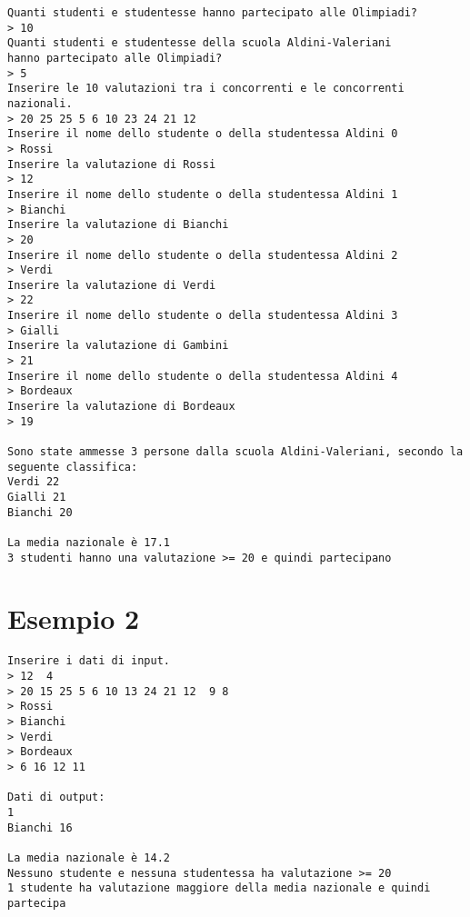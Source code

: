\documentclass[a4paper, 11pt]{exam}
\begin{document}
\begin{verbatim}
Quanti studenti e studentesse hanno partecipato alle Olimpiadi?
> 10
Quanti studenti e studentesse della scuola Aldini-Valeriani 
hanno partecipato alle Olimpiadi?
> 5
Inserire le 10 valutazioni tra i concorrenti e le concorrenti nazionali.
> 20 25 25 5 6 10 23 24 21 12
Inserire il nome dello studente o della studentessa Aldini 0
> Rossi 
Inserire la valutazione di Rossi
> 12
Inserire il nome dello studente o della studentessa Aldini 1
> Bianchi
Inserire la valutazione di Bianchi
> 20
Inserire il nome dello studente o della studentessa Aldini 2
> Verdi
Inserire la valutazione di Verdi
> 22
Inserire il nome dello studente o della studentessa Aldini 3
> Gialli
Inserire la valutazione di Gambini
> 21
Inserire il nome dello studente o della studentessa Aldini 4
> Bordeaux 
Inserire la valutazione di Bordeaux
> 19

Sono state ammesse 3 persone dalla scuola Aldini-Valeriani, secondo la seguente classifica:
Verdi 22
Gialli 21
Bianchi 20

La media nazionale è 17.1
3 studenti hanno una valutazione >= 20 e quindi partecipano
\end{verbatim}


\section*{Esempio 2}
\begin{verbatim}
Inserire i dati di input.
> 12  4
> 20 15 25 5 6 10 13 24 21 12  9 8
> Rossi
> Bianchi
> Verdi
> Bordeaux
> 6 16 12 11

Dati di output:
1
Bianchi 16

La media nazionale è 14.2
Nessuno studente e nessuna studentessa ha valutazione >= 20
1 studente ha valutazione maggiore della media nazionale e quindi partecipa
\end{verbatim}


 
\end{document}
